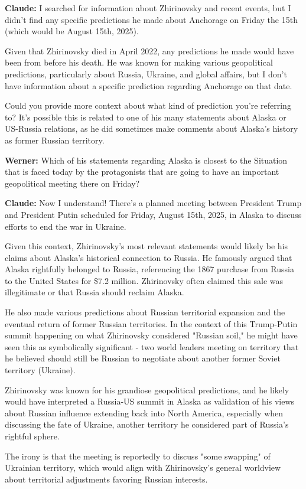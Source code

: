 \documentclass[11pt,a5paper]{scrartcl}
\begin{document}
\begin{claudebox}
\textbf{Claude:} I searched for information about Zhirinovsky and recent events, but I didn't find any specific predictions he made about Anchorage on Friday the 15th (which would be August 15th, 2025).

Given that Zhirinovsky died in April 2022, any predictions he made would have been from before his death. He was known for making various geopolitical predictions, particularly about Russia, Ukraine, and global affairs, but I don't have information about a specific prediction regarding Anchorage on that date.

Could you provide more context about what kind of prediction you're referring to? It's possible this is related to one of his many statements about Alaska or US-Russia relations, as he did sometimes make comments about Alaska's history as former Russian territory.
\end{claudebox}

\begin{humanbox}
\textbf{Werner:} Which of his statements regarding Alaska is closest to the Situation that is faced today by the protagonists that are going to have an important geopolitical meeting there on Friday?
\end{humanbox}

\begin{claudebox}
\textbf{Claude:} Now I understand! There's a planned meeting between President Trump and President Putin scheduled for Friday, August 15th, 2025, in Alaska to discuss efforts to end the war in Ukraine.

Given this context, Zhirinovsky's most relevant statements would likely be his claims about Alaska's historical connection to Russia. He famously argued that Alaska rightfully belonged to Russia, referencing the 1867 purchase from Russia to the United States for \$7.2 million. Zhirinovsky often claimed this sale was illegitimate or that Russia should reclaim Alaska.

He also made various predictions about Russian territorial expansion and the eventual return of former Russian territories. In the context of this Trump-Putin summit happening on what Zhirinovsky considered "Russian soil," he might have seen this as symbolically significant - two world leaders meeting on territory that he believed should still be Russian to negotiate about another former Soviet territory (Ukraine).

Zhirinovsky was known for his grandiose geopolitical predictions, and he likely would have interpreted a Russia-US summit in Alaska as validation of his views about Russian influence extending back into North America, especially when discussing the fate of Ukraine, another territory he considered part of Russia's rightful sphere.

The irony is that the meeting is reportedly to discuss "some swapping" of Ukrainian territory, which would align with Zhirinovsky's general worldview about territorial adjustments favoring Russian interests.
\end{claudebox}
\end{document}
